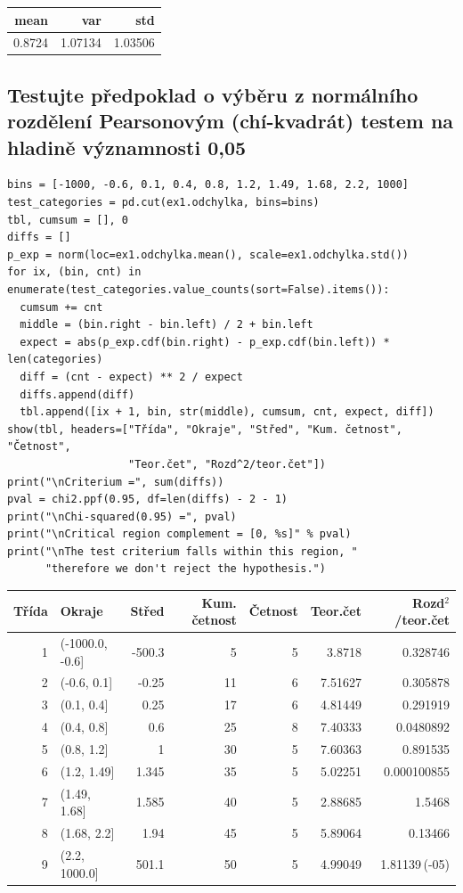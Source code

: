 \documentclass[11pt,titlepage]{article}
\begin{document}
\begin{center}
\begin{tabular}{rrr}
mean & var & std\\
\hline
0.8724 & 1.07134 & 1.03506\\
\end{tabular}
\end{center}
\newpage

\subsection{Testujte předpoklad o výběru z normálního rozdělení Pearsonovým (chí-kvadrát) testem na hladině významnosti 0,05}
\label{sec:org9a919a2}

\begin{listing}[htbp]
\begin{verbatim}
bins = [-1000, -0.6, 0.1, 0.4, 0.8, 1.2, 1.49, 1.68, 2.2, 1000]
test_categories = pd.cut(ex1.odchylka, bins=bins)
tbl, cumsum = [], 0
diffs = []
p_exp = norm(loc=ex1.odchylka.mean(), scale=ex1.odchylka.std())
for ix, (bin, cnt) in enumerate(test_categories.value_counts(sort=False).items()):
  cumsum += cnt
  middle = (bin.right - bin.left) / 2 + bin.left
  expect = abs(p_exp.cdf(bin.right) - p_exp.cdf(bin.left)) * len(categories)
  diff = (cnt - expect) ** 2 / expect
  diffs.append(diff)
  tbl.append([ix + 1, bin, str(middle), cumsum, cnt, expect, diff])
show(tbl, headers=["Třída", "Okraje", "Střed", "Kum. četnost", "Četnost",
                   "Teor.čet", "Rozd^2/teor.čet"])
print("\nCriterium =", sum(diffs))
pval = chi2.ppf(0.95, df=len(diffs) - 2 - 1)
print("\nChi-squared(0.95) =", pval)
print("\nCritical region complement = [0, %s]" % pval)
print("\nThe test criterium falls within this region, "
      "therefore we don't reject the hypothesis.")
\end{verbatim}
\end{listing}

\begin{center}
\begin{tabular}{rlrrrrr}
Třída & Okraje & Střed & Kum. četnost & Četnost & Teor.čet & Rozd\(^{\text{2}}\)/teor.čet\\
\hline
1 & (-1000.0, -0.6] & -500.3 & 5 & 5 & 3.8718 & 0.328746\\
2 & (-0.6, 0.1] & -0.25 & 11 & 6 & 7.51627 & 0.305878\\
3 & (0.1, 0.4] & 0.25 & 17 & 6 & 4.81449 & 0.291919\\
4 & (0.4, 0.8] & 0.6 & 25 & 8 & 7.40333 & 0.0480892\\
5 & (0.8, 1.2] & 1 & 30 & 5 & 7.60363 & 0.891535\\
6 & (1.2, 1.49] & 1.345 & 35 & 5 & 5.02251 & 0.000100855\\
7 & (1.49, 1.68] & 1.585 & 40 & 5 & 2.88685 & 1.5468\\
8 & (1.68, 2.2] & 1.94 & 45 & 5 & 5.89064 & 0.13466\\
9 & (2.2, 1000.0] & 501.1 & 50 & 5 & 4.99049 & 1.81139\,(-05)\\
\end{tabular}
\end{center}
\end{document}
